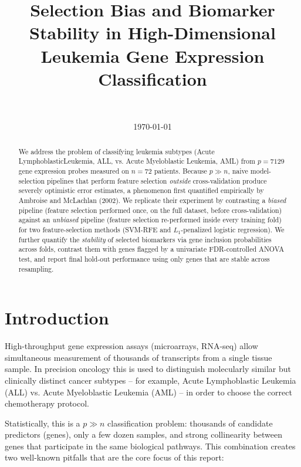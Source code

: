 \documentclass[11pt,a4paper]{article}
\title{Selection Bias and Biomarker Stability in High-Dimensional\\
Leukemia Gene Expression Classification}
\author{\todo{Your Name(s)} \\ \todo{Course / Institution}}
\date{\today}
\begin{document}
\maketitle

\begin{abstract}
We address the problem of classifying leukemia subtypes (Acute LymphoblasticLeukemia, ALL, vs. Acute Myeloblastic Leukemia, AML) from $p=7129$ gene expression probes measured on $n=72$ patients.
Because $p \gg n$, naive model-selection pipelines that perform feature selection \emph{outside} cross-validation produce severely optimistic error estimates, a phenomenon first quantified empirically by Ambroise and McLachlan (2002).
We replicate their experiment by contrasting a \emph{biased} pipeline (feature selection performed once, on the full dataset, before cross-validation) against an \emph{unbiased} pipeline (feature selection re-performed inside every training fold) for two feature-selection methods (SVM-RFE and $L_1$-penalized logistic regression).
We further quantify the \emph{stability} of selected biomarkers via gene inclusion probabilities across folds, contrast them with genes flagged by a univariate FDR-controlled ANOVA test, and report final hold-out performance using only genes that are stable across resampling.
\end{abstract}

\tableofcontents
\newpage

\section{Introduction}
High-throughput gene expression assays (microarrays, RNA-seq) allow simultaneous measurement of thousands of transcripts from a single tissue sample.
In precision oncology this is used to distinguish molecularly similar but clinically distinct cancer subtypes -- for example, Acute Lymphoblastic Leukemia (ALL) vs. Acute Myeloblastic Leukemia (AML) -- in order to choose the correct chemotherapy protocol.

Statistically, this is a $p \gg n$ classification problem: thousands of candidate predictors (genes), only a few dozen samples, and strong collinearity between genes that participate in the same biological pathways.
This combination creates two well-known pitfalls that are the core focus of this report:
\end{document}

